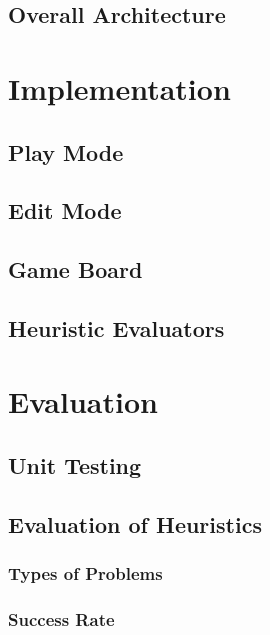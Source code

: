 \documentclass{l4proj}
\begin{document}
\section{Overall Architecture}









\chapter{Implementation}

\section{Play Mode}

\section{Edit Mode}

\section{Game Board}

\section{Heuristic Evaluators}








\chapter{Evaluation}

\section{Unit Testing}

\section{Evaluation of Heuristics}
\subsection{Types of Problems}
\subsection{Success Rate}
\end{document}
